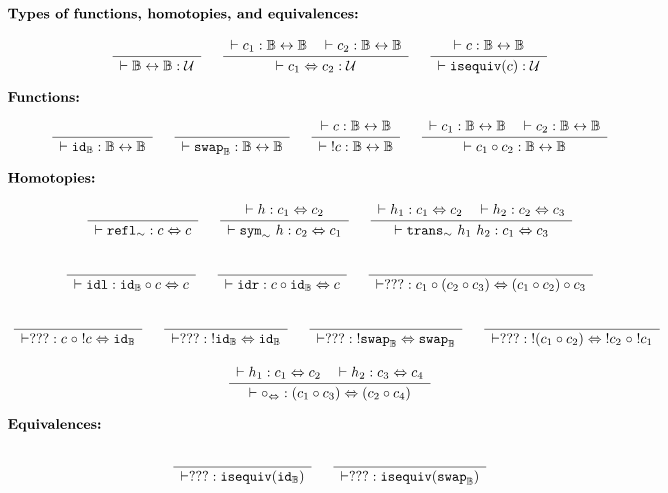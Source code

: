\documentclass[format=acmlarge,review,natbib]{acmart}
\newcommand{\invc}[1]{!#1}
\newcommand{\compc}{\circ}
\newcommand{\reflh}{\mathtt{refl}_{\sim}}
\newcommand{\symh}[1]{\mathtt{sym}_{\sim}~#1}
\newcommand{\transh}[2]{\mathtt{trans}_{\sim}~#1~#2}
\newcommand{\isequiv}[1]{\mathtt{isequiv}(#1)}
\newcommand{\idc}{\mathtt{id}}
\newcommand{\swapc}{\mathtt{swap}}
\newcommand{\idlc}{\mathtt{idl}}
\newcommand{\idrc}{\mathtt{idr}}
\newcommand{\compsim}{\compc_{\isotwo}}
\newcommand{\iso}{\leftrightarrow}
\newcommand{\isotwo}{\Leftrightarrow}
\newcommand{\boolt}{\mathbb{B}}
\newcommand{\univ}{\mathcal{U}}
\newcommand{\Rule}[2]{
\makebox{
$\displaystyle
\frac{\begin{array}{l}#1\\\end{array}}
{\begin{array}{l}#2\\\end{array}}$}}
\newcommand{\proves}{\vdash}
\newcommand{\jdg}[3]{#1 \proves #2 : #3}
\begin{document}
\[\begin{array}{c}
\noalign{\textbf{Types of functions, homotopies, and equivalences:}} \\
\Rule{}{\jdg{}{\boolt\iso\boolt}{\univ}}
\quad
\Rule{\jdg{}{c_1}{\boolt\iso\boolt}
         \quad\jdg{}{c_2}{\boolt\iso\boolt}}
        {\jdg{}{c_1 \isotwo c_2}{\univ}}
\quad
\Rule{\jdg{}{c}{\boolt\iso\boolt}}
        {\jdg{}{\isequiv{c}}{\univ}}
\\
\\
\noalign{\textbf{Functions:}} \\
\Rule{}{\jdg{}{\idc_{\boolt}}{\boolt\iso\boolt}}
\quad
\Rule{}{\jdg{}{\swapc_{\boolt}}{\boolt\iso\boolt}}
\quad
\Rule{\jdg{}{c}{\boolt\iso\boolt}}
        {\jdg{}{\;\invc{c}}{\boolt\iso\boolt}}
\quad
\Rule{\jdg{}{c_1}{\boolt\iso\boolt}
        \quad\jdg{}{c_2}{\boolt\iso\boolt}}
        {\jdg{}{c_1 \compc c_2}{\boolt\iso\boolt}}
\\
\\
\noalign{\textbf{Homotopies:}} \\
\Rule{}
         {\jdg{}{\reflh}{c \isotwo c}}
\quad
\Rule{\jdg{}{h}{c_1 \isotwo c_2}}
        {\jdg{}{\symh{h}}{c_2 \isotwo c_1}}
\quad
\Rule{\jdg{}{h_1}{c_1 \isotwo c_2}
         \quad\jdg{}{h_2}{c_2 \isotwo c_3}}
        {\jdg{}{\transh{h_1}{h_2}}{c_1 \isotwo c_3}}
\\
\\
\Rule{}
        {\jdg{}{\idlc}{\idc_{\boolt} \compc c \isotwo c}}
\quad
\Rule{}
        {\jdg{}{\idrc}{c \compc \idc_{\boolt} \isotwo c}}
\quad
\Rule{}{\jdg{}{???}{c_1 \compc (c_2 \compc c_3) \isotwo (c_1 \compc c_2) \compc c_3}}
\\
\\
\quad
\Rule{}{\jdg{}{???}{c \;\compc \;\invc{c} \isotwo \idc_{\boolt}}}
\quad
\Rule{}{\jdg{}{???}{\;\invc{\idc_{\boolt}} \isotwo \idc_{\boolt}}}
\quad
\Rule{}{\jdg{}{???}{\;\invc{\swapc_{\boolt}} \isotwo \swapc_{\boolt}}}
\quad
\Rule{}{\jdg{}{???}{\;\invc{(c_1\compc c_2)} \isotwo \;\invc{c_2} \;\compc \;\invc{c_1}}}
\\
\\
\Rule{\jdg{}{h_1}{c_1 \isotwo c_2}
         \quad\jdg{}{h_2}{c_3 \isotwo c_4}}
        {\jdg{}{\compsim}{(c_1 \compc c_3) \isotwo (c_2 \compc c_4)}}
\\
\\
\noalign{\textbf{Equivalences:}} \\
\Rule{}{\jdg{}{???}{\isequiv{\idc_{\boolt}}}}
\quad
\Rule{}{\jdg{}{???}{\isequiv{\swapc_{\boolt}}}}
\\
\\

\end{array}\]
\end{document}
